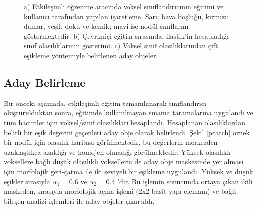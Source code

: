 \documentclass[conference]{IEEEtran}
\begin{document}
\begin{figure}[tb]
\caption{a) Etkileşimli öğrenme aracında voksel sınıflandırıcının eğitimi ve kullanıcı tarafından yapılan işaretleme. Sarı: hava boşluğu, kırmızı: damar, yeşil: doku ve kemik; mavi ise nodül sınıflarını göstermektedir. b) Çevrimiçi eğitim sırasında, ilastik'in hesapladığı sınıf olasılıklarının gösterimi. c) Voksel sınıf olasılıklarından çift eşikleme yöntemiyle belirlenen aday objeler.}
\label{fig1}
\end{figure}

\subsection{Aday Belirleme}
Bir önceki aşamada, etkileşimli eğitim tamamlanarak sınıflandırıcı oluşturulduktan sonra, eğitimde kullanılmayan sınama taramalarına uygulandı ve tüm hacimler için voksel/sınıf olasılıkları hesaplandı. Hesaplanan olasılıklardan belirli bir eşik değerini geçenleri aday obje olarak belirlendi. Şekil \ref{pcatch} örnek bir nodül için olasılık haritası görülmektedir, bu değerlerin merkezden uzaklaştıkca azaldığı ve homojen olmadığı görülmektedir. Yüksek olasılıklı voksellere bağlı düşük olasılıklı voksellerin de aday obje maskesinde yer alması için morfolojik geri-çatma ile iki seviyeli bir eşikleme uygulandı. Yüksek ve düşük eşikler sırasıyla $\alpha_1 = 0.6$ ve $\alpha_2 = 0.4$ 'dir. Bu işlemin sonucunda ortaya çıkan ikili maskeden, sırasıyla morfolojik açma işlemi (2x2 basit yapı elemanı) ve bağlı bileşen analizi işlemleri ile aday objeler çıkartıldı.
\end{document}
